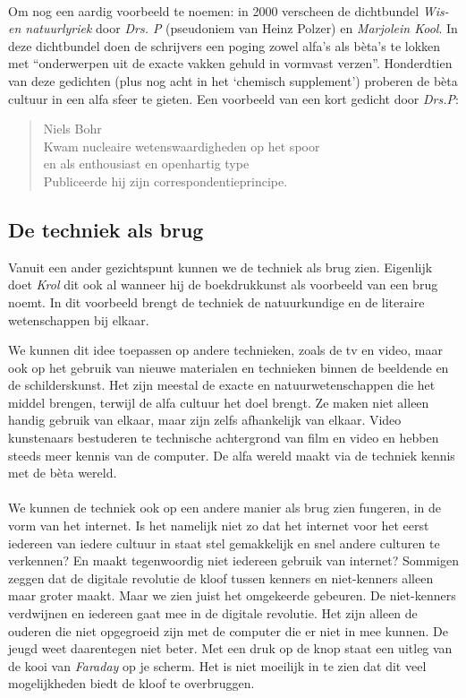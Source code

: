 \paragraph{}

Om nog een aardig voorbeeld te noemen: in 2000 verscheen de dichtbundel \emph{Wis- en natuurlyriek}\cite{DrsP} door \emph{Drs. P} (pseudoniem van Heinz Polzer) en \emph{Marjolein Kool}. In deze dichtbundel doen de schrijvers een poging zowel alfa's als b\`eta's te lokken met ``onderwerpen uit de exacte vakken gehuld in vormvast verzen''. Honderdtien van deze gedichten (plus nog acht in het `chemisch supplement') proberen de b\`eta cultuur in een alfa sfeer te gieten. Een voorbeeld van een kort gedicht door \emph{Drs.P}:

\begin{quote}
Niels Bohr \\
Kwam nucleaire wetenswaardigheden op het spoor \\
en als enthousiast en openhartig type \\
Publiceerde hij zijn correspondentieprincipe.
\end{quote}


\subsection{De techniek als brug}

Vanuit een ander gezichtspunt kunnen we de techniek als brug zien. Eigenlijk doet \emph{Krol} dit ook al wanneer hij de boekdrukkunst als voorbeeld van een brug noemt. In dit voorbeeld brengt de techniek de natuurkundige en de literaire wetenschappen bij elkaar.

We kunnen dit idee toepassen op andere technieken, zoals de tv en video, maar ook op het gebruik van nieuwe materialen en technieken binnen de beeldende en de schilderskunst. Het zijn meestal de exacte en natuurwetenschappen die het middel brengen, terwijl de alfa cultuur het doel brengt. Ze maken niet alleen handig gebruik van elkaar, maar zijn zelfs afhankelijk van elkaar. Video kunstenaars bestuderen te technische achtergrond van film en video en hebben steeds meer kennis van de computer. De alfa wereld maakt via de techniek kennis met de b\`eta wereld.

\paragraph{}

We kunnen de techniek ook op een andere manier als brug zien fungeren, in de vorm van het internet. Is het namelijk niet zo dat het internet voor het eerst iedereen van iedere cultuur in staat stel gemakkelijk en snel andere culturen te verkennen? En maakt tegenwoordig niet iedereen gebruik van internet? Sommigen zeggen dat de digitale revolutie de kloof tussen kenners en niet-kenners alleen maar groter maakt. Maar we zien juist het omgekeerde gebeuren. De niet-kenners verdwijnen en iedereen gaat mee in de digitale revolutie. Het zijn alleen de ouderen die niet opgegroeid zijn met de computer die er niet in mee kunnen. De jeugd weet daarentegen niet beter. Met een druk op de knop staat een uitleg van de kooi van \emph{Faraday} op je scherm. Het is niet moeilijk in te zien dat dit veel mogelijkheden biedt de kloof te overbruggen.
